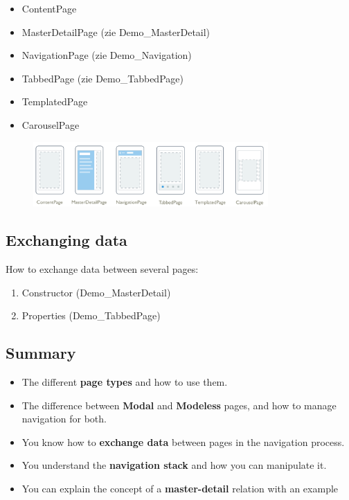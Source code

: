 \documentclass{article}
\newcommand{\bold}[1]{\textbf{#1}}
\begin{document}
\begin{itemize}
    \item ContentPage
    \item MasterDetailPage (zie Demo\_MasterDetail)
    \item NavigationPage (zie Demo\_Navigation)
    \item TabbedPage (zie Demo\_TabbedPage)
    \item TemplatedPage
    \item CarouselPage 
\end{itemize}

\begin{figure}[H]
    \centering
    \includegraphics[width=0.8\textwidth]{pagetypes.png}
    \caption{}
\end{figure}

\subsection{Exchanging data}

How to exchange data between several pages:

\begin{enumerate}
    \item Constructor (Demo\_MasterDetail)
    \item Properties (Demo\_TabbedPage)
\end{enumerate}

\subsection{Summary}

\begin{itemize}
    \item The different \bold{page types} and how to use them.
    \item The difference between \bold{Modal} and \bold{Modeless} pages, and how to manage navigation for both.
    \item You know how to \bold{exchange data} between pages in the navigation process.
    \item You understand the \bold{navigation stack} and how you can manipulate it.
    \item You can explain the concept of a \bold{master-detail} relation with an example
\end{itemize}
\end{document}
